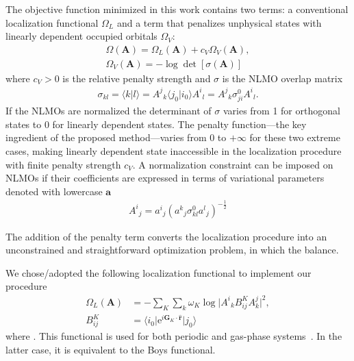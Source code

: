 \documentclass[aps,prl,reprint,amsmath,amssymb]{revtex4-1}
\newcommand*{\imi}{i} %
\newcommand*{\E}{\mathrm{e}}
\newcommand{\ket}[1]{\ensuremath{\vert #1 \rangle}}
\newcommand{\bra}[1]{\ensuremath{\langle #1 \vert}}
\newcommand{\braket}[2]{\ensuremath{\langle #1 \vert #2 \rangle}} %
\newcommand{\op}[1]{\ensuremath{\hat{#1}}} %
\begin{document}
The objective function minimized in this work contains two terms: a conventional localization functional $\Omega_L$ and a term that penalizes unphysical states with linearly dependent occupied orbitals $\Omega_V$:
%
\begin{equation} \label{eq:fun-pen}
\begin{split}
\Omega(\mathbf{A}) = \Omega_L(\mathbf{A}) + c_V \Omega_V(\mathbf{A}), \\
\Omega_V(\mathbf{A}) = - \log \det \left[ \sigma (\mathbf{A}) \right]
\end{split}
\end{equation}
%
where $c_V > 0$ is the relative penalty strength and $\sigma$ is the NLMO overlap matrix 
%
\begin{equation}
\begin{split}
\sigma_{kl} = \braket{k}{l} = {A^j}_k \braket{j_0}{i_0}{A^i}_l = {A^j}_k \sigma_{ji}^0{A^i}_l .
\end{split}
\end{equation}
%
%
If the NLMOs are normalized the determinant of $\sigma$ varies from 1 for orthogonal states to 0 for linearly dependent states. The penalty function---the key ingredient of the proposed method---varies from 0 to $+\infty$ for these two extreme cases, making linearly dependent state inaccessible in the localization procedure with finite penalty strength $c_V$. A normalization constraint can be imposed on NLMOs if their coefficients are expressed in terms of variational parameters denoted with lowercase $\mathbf{a}$
%
\begin{equation}
\begin{split}
{A^i}_j = {a^i}_{j} ({a^k}_{j} \sigma^0_{kl}{a^l}_{j})^{-\frac{1}{2}}
\end{split}
\end{equation}

The addition of the penalty term converts the localization procedure into an unconstrained and straightforward optimization problem, in which the balance. 

We chose/adopted the following localization functional to implement our procedure 
%
\begin{equation} \label{eq:fun-loc}
\begin{split}
\Omega_L(\mathbf{A}) &= - \sum_K \sum_k \omega_K \log \vert {A^i}_k B^K_{ij} A^j_k \vert^2, \\
B^K_{ij} &= \bra{i_0} \E^{\imi \mathbf{G}_K \cdot \mathbf{\op{r}}} \ket{j_0}
\end{split}
\end{equation}
%
where . This functional is used for both periodic and gas-phase systems~\cite{berghold2000general}. In the latter case, it is equivalent to the Boys functional.
\end{document}
